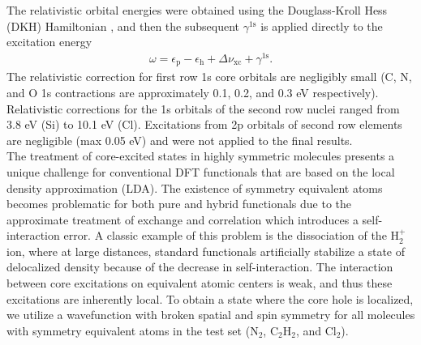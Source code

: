 \documentclass[12pt]{article}
\begin{document}
The relativistic orbital energies were obtained using the Douglass-Kroll Hess (DKH) Hamiltonian \cite{douglas_quantum_1973,hess_applicability_1985, hess_relativistic_1986}, and then the subsequent $\gamma^{\text{1s}}$ is applied directly to the excitation energy
\begin{align}
\omega = \epsilon_{\text{p}} - \epsilon_{\text{h}} + \Delta \nu_{\text{xc}} + \gamma^{\text{1s}} .
\end{align}
The relativistic correction for first row 1s core orbitals are negligibly small (C, N, and O 1s contractions are approximately 0.1, 0.2, and 0.3 eV respectively). Relativistic corrections for the 1s orbitals of the second row nuclei ranged from 3.8 eV (Si) to 10.1 eV (Cl). Excitations from 2p orbitals of second row elements are negligible (max 0.05 eV) and were not applied to the final results. \\
The treatment of core-excited states in highly symmetric molecules presents a unique challenge for conventional DFT functionals that are based on the local density approximation (LDA). The existence of symmetry equivalent atoms becomes problematic for both pure and hybrid functionals due to the approximate treatment of exchange and correlation which introduces a self-interaction error.\cite{lundberg_quantifying_2005} A classic example of this problem is the dissociation of the H$_2^+$ ion, where at large distances, standard functionals artificially stabilize a state of delocalized density because of the decrease in self-interaction.\cite{bally_incorrect_1997} The interaction between core excitations on equivalent atomic centers is weak, and thus these excitations are inherently local. To obtain a state where the core hole is localized, we utilize a wavefunction with broken spatial and spin symmetry for all molecules with symmetry equivalent atoms in the test set (N$_2$, C$_2$H$_2$, and Cl$_2$).
\end{document}
